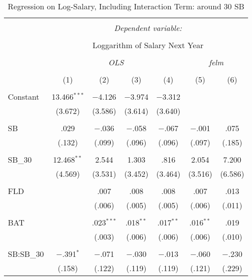 
\begin{table}[H] \centering
  \caption{Regression on Log-Salary, Including Interaction Term: around 30 SB}
  \label{SB30_A}
\tiny
\begin{tabular}{@{\extracolsep{5pt}}lcccccc}
\\[-1.8ex]\hline
\hline \\[-1.8ex]
 & \multicolumn{6}{c}{\textit{Dependent variable:}} \\
\cline{2-7}
\\[-1.8ex] & \multicolumn{6}{c}{Loggarithm of Salary Next Year} \\
\\[-1.8ex] & \multicolumn{4}{c}{\textit{OLS}} & \multicolumn{2}{c}{\textit{felm}} \\
\\[-1.8ex] & (1) & (2) & (3) & (4) & (5) & (6)\\
\hline \\[-1.8ex]
 Constant & 13.466$^{***}$ & $-$4.126 & $-$3.974 & $-$3.312 &  &  \\
  & (3.672) & (3.586) & (3.614) & (3.640) &  &  \\
  & & & & & & \\
 SB & .029 & $-$.036 & $-$.058 & $-$.067 & $-$.001 & .075 \\
  & (.132) & (.099) & (.096) & (.096) & (.097) & (.185) \\
  & & & & & & \\
 SB\_30 & 12.468$^{**}$ & 2.544 & 1.303 & .816 & 2.054 & 7.200 \\
  & (4.569) & (3.531) & (3.452) & (3.464) & (3.516) & (6.586) \\
  & & & & & & \\
 FLD &  & .007 & .008 & .008 & .007 & .013 \\
  &  & (.006) & (.005) & (.005) & (.006) & (.011) \\
  & & & & & & \\
 BAT &  & .023$^{***}$ & .018$^{**}$ & .017$^{**}$ & .016$^{**}$ & .019 \\
  &  & (.003) & (.006) & (.006) & (.006) & (.010) \\
  & & & & & & \\
 SB:SB\_30 & $-$.391$^{*}$ & $-$.071 & $-$.030 & $-$.013 & $-$.060 & $-$.230 \\
  & (.158) & (.122) & (.119) & (.119) & (.121) & (.229) \\

\end{tabular}
\end{table}

